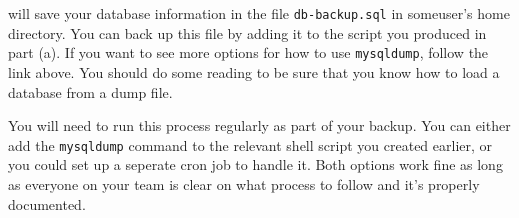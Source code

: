 \documentclass{article}   	%
\begin{document}
will save your database information in the file \texttt{db-backup.sql} in someuser's home directory. You can back up this file by adding it to the script you produced in part (a). If you want to see more options for how to use \texttt{mysqldump}, follow the link above. You should do some reading to be sure that you know how to load a database from a dump file.

You will need to run this process regularly as part of your backup. You can either add the \texttt{mysqldump} command to the relevant shell script you created earlier, or you could set up a seperate cron job to handle it. Both options work fine as long as everyone on your team is clear on what process to follow and it's properly documented. 
\end{document}
